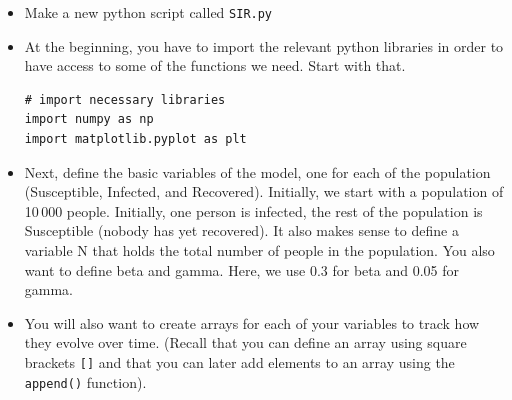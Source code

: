 \documentclass[pdflatex,a4paper]{article}
\begin{document}
\begin{itemize}
\item
Make a new python script called \verb=SIR.py=
\item
At the beginning, you have to import the relevant python libraries in order to have access to some of the functions we need. Start with that.

\begin{lstlisting}
# import necessary libraries
import numpy as np
import matplotlib.pyplot as plt
\end{lstlisting}

\item

Next, define the basic variables of the model, one for each of the population (Susceptible, Infected, and Recovered). Initially, we start with a population of 10\,000 people. Initially, one person is infected, the rest of the population is Susceptible (nobody has yet recovered). It also makes sense to define a variable N that holds the total number of people in the population. You also want to define beta and gamma. Here, we use 0.3 for beta and 0.05 for gamma. 

\item

You will also want to create arrays for each of your variables to track how they evolve over time. (Recall that you can define an array using square brackets \verb=[]= and that you can later add elements to an array using the \verb=append()= function). 


\end{itemize}
\end{document}
